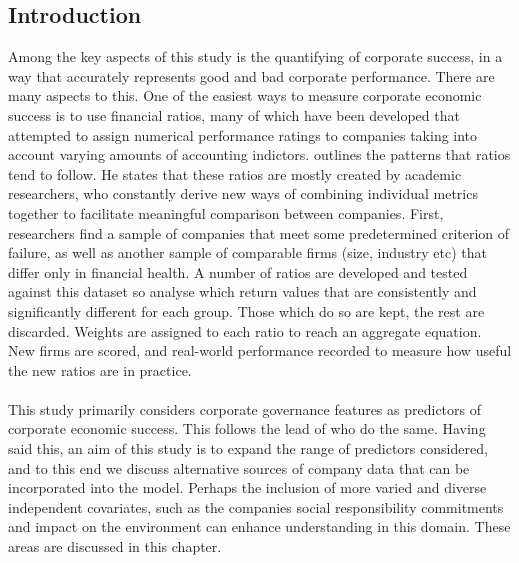 \subsection{Introduction}
{Among the key aspects of this study is the quantifying of corporate success, in a way that accurately   represents good and bad corporate performance. There are many aspects to this. One of the easiest ways to measure corporate economic success is to use financial ratios, many of which have been developed that attempted to assign numerical performance ratings to companies taking into account varying amounts of accounting indictors. \cite {eidleman1995z} outlines the patterns that ratios tend to follow. He states that these ratios are mostly created by academic researchers, who constantly derive new ways of combining individual metrics together to facilitate meaningful comparison between companies. First, researchers find a sample of companies that meet some predetermined criterion of failure, as well as another sample of comparable firms (size, industry etc) that differ only in financial health. A number of ratios are developed and tested against this dataset so analyse which return values that are consistently and significantly different for each group. Those which do so are kept, the rest are discarded. Weights are assigned to each ratio to reach an aggregate equation. New firms are scored, and real-world performance recorded to measure how useful the new ratios are in practice. \\\\
This study primarily considers corporate governance features as predictors of corporate economic success. This follows the lead of \cite{moldovan2015learning} who do the same. Having said this, an aim of this study is to expand the range of predictors considered, and to this end we discuss alternative sources of company data that can be incorporated into the model. Perhaps the inclusion of more varied and diverse independent covariates, such as the companies social responsibility commitments and  impact on the environment can enhance understanding in this domain. These areas are discussed in this chapter.    }
